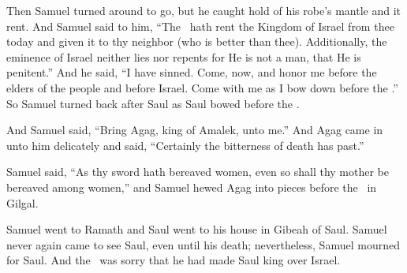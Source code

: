 \begin{inparaenum}
   Then Samuel turned around to go, but he caught hold of his robe's mantle and it rent.%
   And Samuel said to him, ``The \lord\ hath rent the Kingdom of Israel from thee today and given it to thy neighbor (who is better than thee).%
   Additionally, the eminence of Israel neither lies nor repents for He is not a man, that He is penitent.''%
   And he said, ``I have sinned. Come, now, and honor me before the elders of the people and before Israel. Come with me as I bow down before the \lord.''%
   So Samuel turned back after Saul as Saul bowed before the \lord.%

   And Samuel said, ``Bring Agag, king of Amalek, unto me.'' And Agag came in unto him delicately and said, ``Certainly the bitterness of death has past.''%

   Samuel said, ``As thy sword hath bereaved women, even so shall thy mother be bereaved among women,'' and Samuel hewed Agag into pieces before the \lord\ in Gilgal.%

   Samuel went to Ramath and Saul went to his house in Gibeah of Saul.%
   Samuel never again came to see Saul, even until his death; nevertheless, Samuel mourned for Saul. And the \lord\ was sorry that he had made Saul king over Israel.%
\end{inparaenum}
